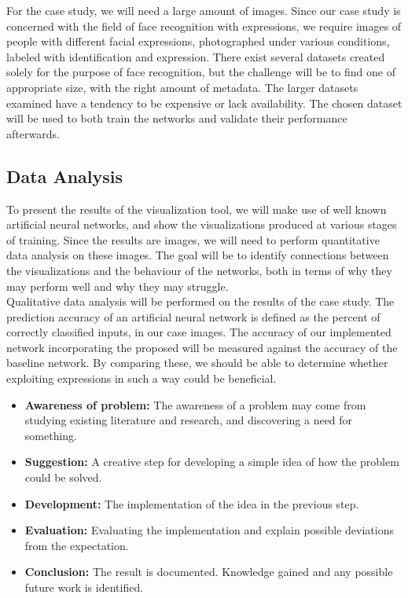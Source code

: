 \noindent For the case study, we will need a large amount of images. Since our case study is concerned with the field of face recognition with expressions, we require images of people with different facial expressions, photographed under various conditions, labeled with identification and expression. There exist several datasets created solely for the purpose of face recognition, but the challenge will be to find one of appropriate size, with the right amount of metadata. The larger datasets examined have a tendency to be expensive or lack availability. The chosen dataset will be used to both train the networks and validate their performance afterwards.

\subsection{Data Analysis}

To present the results of the visualization tool, we will make use of well known artificial neural networks, and show the visualizations produced at various stages of training. Since the results are images, we will need to perform quantitative data analysis on these images. The goal will be to identify connections between the visualizations and the behaviour of the networks, both in terms of why they may perform well and why they may struggle. \\

\noindent Qualitative data analysis will be performed on the results of the case study. The prediction accuracy of an artificial neural network is defined as the percent of correctly classified inputs, in our case images. The accuracy of our implemented network incorporating the proposed will be measured against the accuracy of the baseline network. By comparing these, we should be able to determine whether exploiting expressions in such a way could be beneficial.


\begin{itemize}
    \item \textbf{Awareness of problem:} The awareness of a problem may come from studying existing literature and research, and discovering a need for something.
    \item \textbf{Suggestion:} A creative step for developing a simple idea of how the problem could be solved.
    \item \textbf{Development:} The implementation of the idea in the previous step.
    \item \textbf{Evaluation:} Evaluating the implementation and explain possible deviations from the expectation.
    \item \textbf{Conclusion:} The result is documented. Knowledge gained and any possible future work is identified.
\end{itemize}

